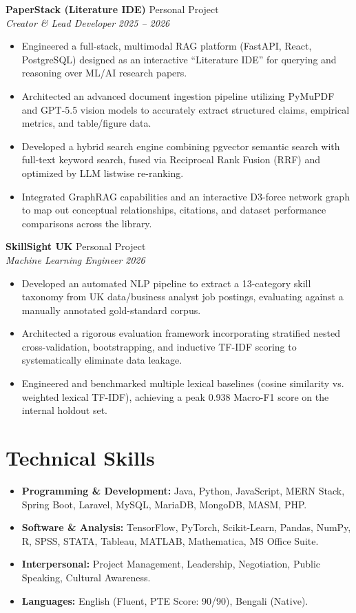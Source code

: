 \documentclass[a4paper,10pt]{article}
\newcommand{\entry}[4]{%
  \noindent\textbf{#1} \hfill #2\\
  \textit{#3} \hfill \textit{#4}\par\vspace{2pt}
}
\begin{document}
\entry{PaperStack (Literature IDE)}{Personal Project}{Creator \& Lead Developer}{2025 -- 2026}
\begin{itemize}
  \item Engineered a full-stack, multimodal RAG platform (FastAPI, React, PostgreSQL) designed as an interactive ``Literature IDE'' for querying and reasoning over ML/AI research papers.
  \item Architected an advanced document ingestion pipeline utilizing PyMuPDF and GPT-5.5 vision models to accurately extract structured claims, empirical metrics, and table/figure data.
  \item Developed a hybrid search engine combining pgvector semantic search with full-text keyword search, fused via Reciprocal Rank Fusion (RRF) and optimized by LLM listwise re-ranking.
  \item Integrated GraphRAG capabilities and an interactive D3-force network graph to map out conceptual relationships, citations, and dataset performance comparisons across the library.
\end{itemize}

\entry{SkillSight UK}{Personal Project}{Machine Learning Engineer}{2026}
\begin{itemize}
  \item Developed an automated NLP pipeline to extract a 13-category skill taxonomy from UK data/business analyst job postings, evaluating against a manually annotated gold-standard corpus.
  \item Architected a rigorous evaluation framework incorporating stratified nested cross-validation, bootstrapping, and inductive TF-IDF scoring to systematically eliminate data leakage.
  \item Engineered and benchmarked multiple lexical baselines (cosine similarity vs. weighted lexical TF-IDF), achieving a peak 0.938 Macro-F1 score on the internal holdout set.
\end{itemize}

\section{Technical Skills}
\begin{itemize}
  \item \textbf{Programming \& Development:} Java, Python, JavaScript, MERN Stack, Spring Boot, Laravel, MySQL, MariaDB, MongoDB, MASM, PHP.
  \item \textbf{Software \& Analysis:} TensorFlow, PyTorch, Scikit-Learn, Pandas, NumPy, R, SPSS, STATA, Tableau, MATLAB, Mathematica, MS Office Suite.
  \item \textbf{Interpersonal:} Project Management, Leadership, Negotiation, Public Speaking, Cultural Awareness.
  \item \textbf{Languages:} English (Fluent, PTE Score: 90/90), Bengali (Native).
\end{itemize}
\end{document}
